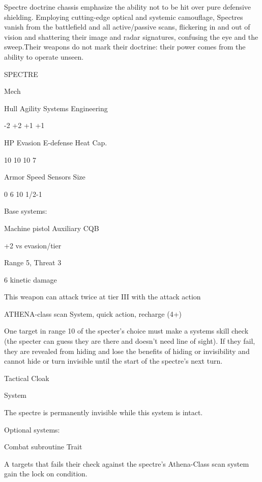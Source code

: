 Spectre doctrine chassis emphasize the ability not to be hit over pure defensive shielding.  
Employing cutting-edge optical and systemic camouflage, Spectres vanish from the battlefield  
and all active/passive scans, flickering in and out of vision and shattering their image and radar  
signatures, confusing the eye and the sweep.Their weapons do not mark their doctrine: their  
power comes from the ability to operate unseen. 
 

 SPECTRE 

 Mech 

 Hull       Agility      Systems       Engineering 

 -2         +2           +1            +1 

 HP         Evasion      E-defense     Heat Cap. 

 10         10           10            7 

 Armor      Speed        Sensors       Size 

 0          6            10            1/2-1 

Base systems:  

Machine pistol  
Auxiliary CQB
 
+2 vs evasion/tier
 
Range 5, Threat 3
 
6 kinetic damage
 
This weapon can attack twice at tier III with the attack action
 

ATHENA-class scan  
System, quick action, recharge (4+)
 
One target in range 10 of the specter’s choice must make a systems skill check (the specter can  
guess they are there and doesn’t need line of sight). If they fail, they are revealed from hiding and  
lose the benefits of hiding or invisibility and cannot hide or turn invisible until the start of the  
spectre’s next turn.
 

Tactical Cloak
 
System
 
The spectre is permanently invisible while this system is intact.
 

Optional systems:  

                                                                                                          


Combat subroutine  
Trait
 
A targets that fails their check against the spectre’s Athena-Class scan system gain the lock on  
condition.
 

